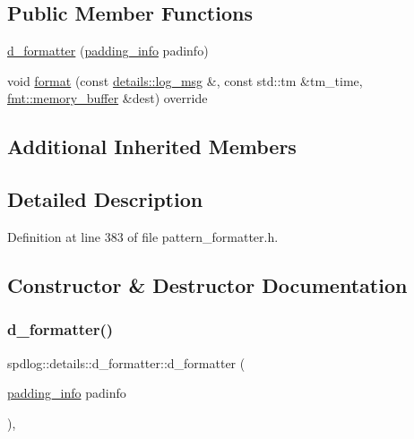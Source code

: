 \subsection*{Public Member Functions}
\begin{DoxyCompactItemize}
\item 
\hyperlink{classspdlog_1_1details_1_1d__formatter_aa5c9a67121b2ab9395b3bed60f5e56a8}{d\+\_\+formatter} (\hyperlink{structspdlog_1_1details_1_1padding__info}{padding\+\_\+info} padinfo)
\item 
void \hyperlink{classspdlog_1_1details_1_1d__formatter_ad1c7decfd7bfa7ecd6fd105e2d74bed4}{format} (const \hyperlink{structspdlog_1_1details_1_1log__msg}{details\+::log\+\_\+msg} \&, const std\+::tm \&tm\+\_\+time, \hyperlink{format_8h_a21cbf729f69302f578e6db21c5e9e0d2}{fmt\+::memory\+\_\+buffer} \&dest) override
\end{DoxyCompactItemize}
\subsection*{Additional Inherited Members}


\subsection{Detailed Description}


Definition at line 383 of file pattern\+\_\+formatter.\+h.



\subsection{Constructor \& Destructor Documentation}
\mbox{\label{classspdlog_1_1details_1_1d__formatter_aa5c9a67121b2ab9395b3bed60f5e56a8}} 
\subsubsection{\texorpdfstring{d\+\_\+formatter()}{d\_formatter()}}
{\footnotesize\ttfamily spdlog\+::details\+::d\+\_\+formatter\+::d\+\_\+formatter (\begin{DoxyParamCaption}\item[{\hyperlink{structspdlog_1_1details_1_1padding__info}{padding\+\_\+info}}]{padinfo }\end{DoxyParamCaption})\hspace{0.3cm}{\ttfamily [inline]}, {\ttfamily [explicit]}}



